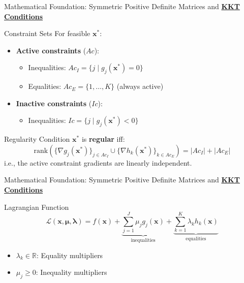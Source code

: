 \documentclass{beamer}
\begin{document}
\begin{frame}{{Mathematical Foundation: Symmetric Positive Definite Matrices and \textbf{\underline{KKT Conditions}}}}

\begin{block}{Constraint Sets}
For feasible $\bm{x}^*$:

\begin{itemize}
\item \textbf{Active constraints} ($Ac$):
\begin{itemize}
\item Inequalities: $Ac_I = \{j \mid g_j(\bm{x}^*) = 0\}$
\item Equalities: $Ac_E = \{1,\ldots,K\}$ (always active)
\end{itemize}

\item \textbf{Inactive constraints} ($Ic$):
\begin{itemize}
\item Inequalities: $Ic = \{j \mid g_j(\bm{x}^*) < 0\}$
\end{itemize}
\end{itemize}
\end{block}

\begin{block}{Regularity Condition}
$\bm{x}^*$ is \textbf{regular} iff:
\[
\mathrm{rank}\left(\{\nabla g_j(\bm{x}^*)\}_{j \in Ac_I} \cup \{\nabla h_k(\bm{x}^*)\}_{k \in Ac_E}\right) = |Ac_I| + |Ac_E|
\]
i.e., the active constraint gradients are linearly independent.
\end{block}


\end{frame}

\begin{frame}{{Mathematical Foundation: Symmetric Positive Definite Matrices and \textbf{\underline{KKT Conditions}}}}
\begin{block}{Lagrangian Function}
\[
\mathcal{L}(\bm{x}, \bm{\mu}, \bm{\lambda}) = f(\bm{x}) + \underbrace{\sum_{j=1}^J \mu_j g_j(\bm{x})}_{\text{inequalities}} + \underbrace{\sum_{k=1}^K \lambda_k h_k(\bm{x})}_{\text{equalities}}
\]
\begin{itemize}
\item $\lambda_k \in \mathbb{R}$: Equality multipliers
\item $\mu_j \geq 0$: Inequality multipliers
\end{itemize}
\end{block}
\end{frame}
\end{document}
